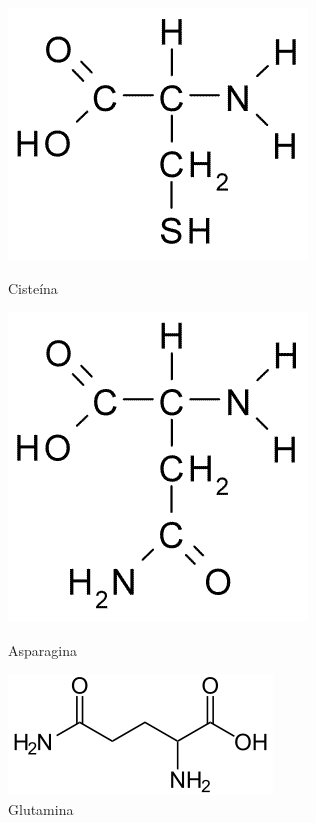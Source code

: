 \documentclass[a4paper,12pt]{article}
\begin{document}
 	\begin{figure}[H]
 	\begin{center}
 		\begin{minipage}{0.3\linewidth}
 			\centering   
 			\includegraphics[width=0.8\linewidth]{cysteine.png}	
 			\caption{Cisteína}
 			\label{fig:cysteine}
 		\end{minipage}
 		\begin{minipage}{0.3\linewidth}
 			\centering   
 			\includegraphics[width=0.65\linewidth]{asparagine.png}
 			\caption{Asparagina}
 			\label{fig:asparagine}
 		\end{minipage}
 		\begin{minipage}{0.3\linewidth}
 			\centering   
 			\includegraphics[width=1\linewidth]{glutamine.png}
 			\caption{Glutamina}
 			\label{fig:glutamine}
 		\end{minipage}
 	\end{center}
 	\end{figure}
\end{document}
